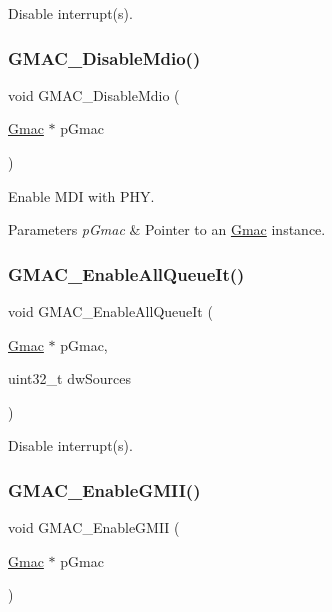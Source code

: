 Disable interrupt(s). \mbox{\label{group__gmac__defines_ga6013c7006f83c59d4895a92e3f473804}} 
\subsubsection{\texorpdfstring{GMAC\_DisableMdio()}{GMAC\_DisableMdio()}}
{\footnotesize\ttfamily void G\+M\+A\+C\+\_\+\+Disable\+Mdio (\begin{DoxyParamCaption}\item[{\mbox{\hyperlink{structGmac}{Gmac}} $\ast$}]{p\+Gmac }\end{DoxyParamCaption})}



Enable M\+DI with P\+HY. 


\begin{DoxyParams}{Parameters}
{\em p\+Gmac} & Pointer to an \mbox{\hyperlink{structGmac}{Gmac}} instance. \\
\hline
\end{DoxyParams}
\mbox{\label{group__gmac__defines_ga9de1f2c0ddd04e5a49f6a568b62828b5}} 
\subsubsection{\texorpdfstring{GMAC\_EnableAllQueueIt()}{GMAC\_EnableAllQueueIt()}}
{\footnotesize\ttfamily void G\+M\+A\+C\+\_\+\+Enable\+All\+Queue\+It (\begin{DoxyParamCaption}\item[{\mbox{\hyperlink{structGmac}{Gmac}} $\ast$}]{p\+Gmac,  }\item[{uint32\+\_\+t}]{dw\+Sources }\end{DoxyParamCaption})}

Disable interrupt(s). \mbox{\label{group__gmac__defines_ga7fe750f0610e329ea954e40313a59697}} 
\subsubsection{\texorpdfstring{GMAC\_EnableGMII()}{GMAC\_EnableGMII()}}
{\footnotesize\ttfamily void G\+M\+A\+C\+\_\+\+Enable\+G\+M\+II (\begin{DoxyParamCaption}\item[{\mbox{\hyperlink{structGmac}{Gmac}} $\ast$}]{p\+Gmac }\end{DoxyParamCaption})}



